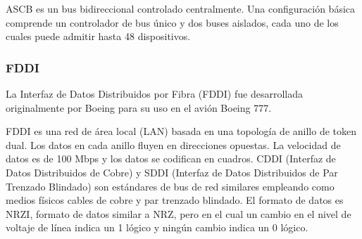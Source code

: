 ASCB es un bus bidireccional controlado centralmente. Una configuración básica comprende un controlador de bus único y dos buses aislados, cada uno de los cuales puede admitir hasta 48 dispositivos.

\subsubsection{FDDI}
\label{sec:01.02.FDDI}

La Interfaz de Datos Distribuidos por Fibra (FDDI) fue desarrollada originalmente por Boeing para su uso en el avión Boeing 777. 

FDDI es una red de área local (LAN) basada en una topología de anillo de token dual. Los datos en cada anillo fluyen en direcciones opuestas. La velocidad de datos es de 100 Mbps y los datos se codifican en cuadros. 
CDDI (Interfaz de Datos Distribuidos de Cobre) y SDDI (Interfaz de Datos Distribuidos de Par Trenzado Blindado) son estándares de bus de red similares empleando como medios físicos cables de cobre y par trenzado blindado. 
El formato de datos es NRZI, formato de datos similar a NRZ, pero en el cual un cambio en el nivel de voltaje de línea indica un 1 lógico y ningún cambio indica un 0 lógico. 
